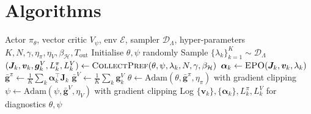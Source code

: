 \documentclass[12pt, letterpaper]{article}
\begin{document}
\section{Algorithms}
\label{sec:algorithms}

\begin{algorithm}[!ht]
\caption{Pareto Set Learning with EPO}
\label{alg:psl-outer}
\begin{algorithmic}[1]
\Require Actor $\pi_\theta$, vector critic $V_\psi$, env $\mathcal{E}$, sampler $\mathcal{D}_{\Lambda}$, hyper-parameters $K, N, \gamma, \eta_\pi, \eta_V, \beta_{\mathcal{H}}, T_{\text{out}}$
\State Initialise $\theta, \psi$ randomly
    \State Sample $\{\lambda_k\}_{k=1}^{K} \sim \mathcal{D}_{\Lambda}$ 
        \State $(\bm{J}_k, \bm{v}_k, \bm{g}_k^{V}, L_k^{\pi}, L_k^{V}) \gets \textsc{CollectPref}(\theta, \psi, \lambda_k, N, \gamma, \beta_{\mathcal{H}})$ 
        \State $\bm{\alpha}_k \gets \textsc{EPO}(\bm{J}_k, \bm{v}_k, \lambda_k)$ 
    \EndFor
    \State $\bar{\bm{g}}^{\pi} \gets \tfrac{1}{K}\sum_k \bm{\alpha}_k^{\top} \bm{J}_k$
    \State $\bar{\bm{g}}^{V} \gets \tfrac{1}{K}\sum_k \bm{g}_k^{V}$
    \State $\theta \gets \mathrm{Adam}(\theta, \bar{\bm{g}}^{\pi}, \eta_{\pi})$ with gradient clipping
    \State $\psi \gets \mathrm{Adam}(\psi, \bar{\bm{g}}^{V}, \eta_{V})$ with gradient clipping
    \State Log $\{\bm{v}_k\}, \{\bm{\alpha}_k\}, L_k^{\pi}, L_k^{V}$ for diagnostics
\EndFor
\State \Return $\theta, \psi$
\end{algorithmic}
\end{algorithm}
\end{document}
